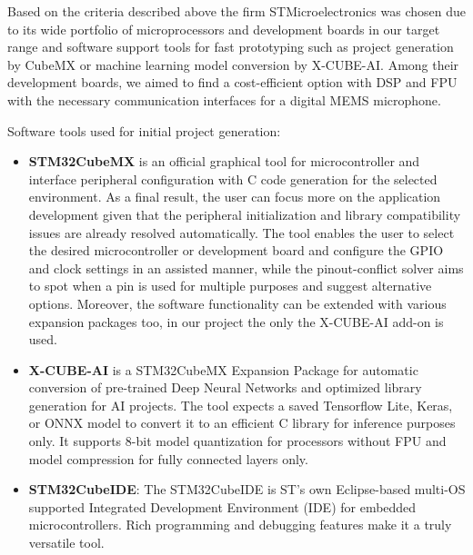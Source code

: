 Based on the criteria described above the firm STMicroelectronics was chosen due to its wide portfolio of microprocessors and development boards in our target range and software support tools for fast prototyping such as project generation by CubeMX or machine learning model conversion by X-CUBE-AI. Among their development boards, we aimed to find a cost-efficient option with DSP and FPU with the necessary communication interfaces for a digital MEMS microphone. 


Software tools used for initial project generation:
\begin{itemize}
  \item  \textbf{STM32CubeMX} is an official graphical tool for microcontroller and interface peripheral configuration with C code generation for the selected environment. As a final result, the user can focus more on the application development given that the peripheral initialization and library compatibility issues are already resolved automatically. The tool enables the user to select the desired microcontroller or development board and configure the GPIO and clock settings in an assisted manner, while the pinout-conflict solver aims to spot when a pin is used for multiple purposes and suggest alternative options. Moreover, the software functionality can be extended with various expansion packages too, in our project the only the X-CUBE-AI add-on is used.
  \item  \textbf{X-CUBE-AI} is a STM32CubeMX Expansion Package for automatic conversion of pre-trained Deep Neural Networks and optimized library generation for AI projects. The tool expects a saved Tensorflow Lite, Keras, or ONNX model to convert it to an efficient C library for inference purposes only. It supports 8-bit model quantization for processors without FPU and model compression for fully connected layers only.
 \item  \textbf{STM32CubeIDE}: The STM32CubeIDE is ST's own Eclipse-based multi-OS supported Integrated Development Environment (IDE) for embedded microcontrollers. Rich programming and debugging features make it a truly versatile tool.
\end{itemize}  


